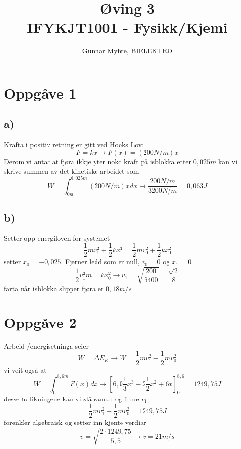\documentclass[12pt,a4paper]{article}
\title{%
  Øving 3 \\
  \large IFYKJT1001 - Fysikk/Kjemi \\
  }
\author{Gunnar Myhre, BIELEKTRO}
\begin{document}
  \maketitle

  \section*{Oppgåve 1}
    \subsection*{a)}
    Krafta i positiv retning  er gitt ved Hooks Lov:
    \begin{equation}
      F = kx \rightarrow F(x) = (200N/m)x
    \end{equation}
    Derom vi antar at fjøra ikkje yter noko kraft på isblokka etter $0,025m$ kan vi skrive
    summen av det kinetiske arbeidet som
    \begin{equation}
      W = \int_{0m}^{0,025m}(200N/m)xdx \rightarrow \frac{200N/m}{3200N/m} = 0,063 J
    \end{equation}

    \subsection*{b)}
    Setter opp energiloven for systemet
    \begin{equation}
      \frac{1}{2}mv_1^2 +
      \frac{1}{2}kx_1^2 =
      \frac{1}{2}mv_0^2 + 
      \frac{1}{2}kx_0^2
    \end{equation}
    setter $x_0 = -0,025$. Fjerner ledd som er null, $v_0 = 0$ og $x_1 = 0$
    \begin{equation}
      \frac{1}{2}v_1^2m = kx_0^2 \rightarrow v_1 = \sqrt{\frac{200}{6400}} = \frac{\sqrt{2}}{8}
    \end{equation}
    farta når isblokka slipper fjøra er $0,18 m/s$

  \section*{Oppgåve 2}
    Arbeid-/energisetninga seier
    \begin{equation}
      W = \Delta E_K \rightarrow
      W =
      \frac{1}{2}mv_1^2 - 
      \frac{1}{2}mv_0^2
    \end{equation}
    vi veit også at 
    \begin{equation}
     W = \int_0^{8,6m}F(x)dx \rightarrow
      \left[ 6,0\frac{1}{3}x^3 - 2\frac{1}{2}x^2 + 6x \right] _0^{8,6} = 1249,75J
    \end{equation}
    desse to likningene kan vi slå saman og finne $v_1$
    \begin{equation}
      \frac{1}{2}mv_1^2 - \frac{1}{2}mv_0^2 = 1249,75J
    \end{equation}
    forenkler algebraisk og setter inn kjente verdiar
    \begin{equation}
      v = \sqrt{\frac{2\cdot 1249,75}{5,5}} \rightarrow  v = 21 m/s
    \end{equation}
\end{document}

